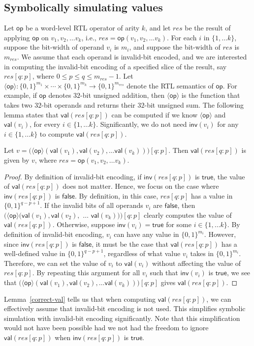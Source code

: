 \documentclass{llncs}
\newcommand{\val}{\ensuremath{\mathsf{val}}}
\newcommand{\inv}{\ensuremath{\mathsf{inv}}}
\newcommand{\op}{\ensuremath{\mathsf{op}}}
\newcommand{\true}{\ensuremath{\mathsf{true}}}
\newcommand{\false}{\ensuremath{\mathsf{false}}}
\begin{document}
\subsection{Symbolically simulating values}\label{subsec:sim-val}
Let ${\op}$ be a word-level RTL operator of arity $k$, and let $res$
be the result of applying ${\op}$ on $v_1, v_2, \ldots v_k$, i.e.,
$res = {\op}(v_1, v_2, \ldots v_k)$.  For each $i$ in $\{1, \ldots
k\}$, suppose the bit-width of operand $v_i$ is $m_i$, and suppose the
bit-width of $res$ is $m_{res}$.  We assume that each operand is
invalid-bit encoded, and we are interested in computing the
invalid-bit encoding of a specified slice of the result, say
$res[q:p]$, where $0 \le p \le q \le m_{res} - 1$.  
Let $\langle {\op} \rangle: \{0, 1\}^{m_1} \times \cdots
\times \{0, 1\}^{m_k} \rightarrow \{0, 1\}^{m_{res}}$ denote the RTL
semantics of ${\op}$.  For example, if ${\op}$ denotes $32$-bit unsigned
addition, then $\langle {\op} \rangle$ is the function that takes two
$32$-bit operands and returns their $32$-bit unsigned sum.  The following lemma
states that ${\val}(res[q:p])$ can be computed if we know $\langle {\op}
\rangle$ and ${\val}(v_i)$, for every $i \in \{1, \ldots k\}$.
Significantly, we do not need ${\inv}(v_i)$ for any $i \in \{1, \ldots
k\}$ to compute ${\val}(res[q:p])$.  
\begin{lemma}\label{correct-val}
  Let $v = \big(\langle {\op} \rangle({\val}(v_1), {\val}(v_2), \ldots
  {\val}(v_k))\big)[q:p]$.  Then ${\val}(res[q:p])$ is given by $v$,
  where $res = {\op}(v_1, v_2, \ldots v_k)$.
\end{lemma}
\begin{proof}
  By definition of invalid-bit encoding, if ${\inv}(res[q:p])$ is
  $\true$, the value of ${\val}(res[q:p])$ does not matter.  Hence, we
  focus on the case where ${\inv}(res[q:p])$ is $\false$.  By
  definition, in this case, $res[q:p]$ has a value in $\{0,
  1\}^{q-p+1}$.  If the invalid bits of all operands $v_i$ are
  $\false$, then $\big(\langle {\op} \rangle({\val}(v_1),
  {\val}(v_2),$ $\ldots$ ${\val}(v_k))\big)[q:p]$ clearly computes the
  value of ${\val}(res[q:p])$.  Otherwise, suppose ${\inv}(v_i) =
  \true$ for some $i \in \{1, \ldots k\}$.  By definition of
  invalid-bit encoding, $v_i$ can have any value in $\{0, 1\}^{m_i}$.
  However, since ${\inv}(res[q:p])$ is $\false$, it must be the case
  that ${\val}(res[q:p])$ has a well-defined value in $\{0,
  1\}^{q-p+1}$, regardless of what value $v_i$ takes in $\{0,
  1\}^{m_i}$.  Therefore, we can set the value of $v_i$ to
  ${\val}(v_i)$ without affecting the value of $res[q:p]$.  By
  repeating this argument for all $v_i$ such that ${\inv}(v_i)$ is
  $\true$, we see that $\big(\langle {\op} \rangle({\val}(v_1),
       {\val}(v_2), \ldots {\val}(v_k))\big)[q:p]$ gives
       ${\val}(res[q:p])$.
\end{proof}
Lemma~\ref{correct-val} tells us that when computing
${\val}(res[q:p])$, we can effectively assume that invalid-bit
encoding is not used.  This simplifies symbolic simulation with
invalid-bit encoding significantly.  Note that this simplification
would not have been possible had we not had the freedom to ignore
${\val}(res[q:p])$ when ${\inv}(res[q:p])$ is $\true$.
\end{document}
